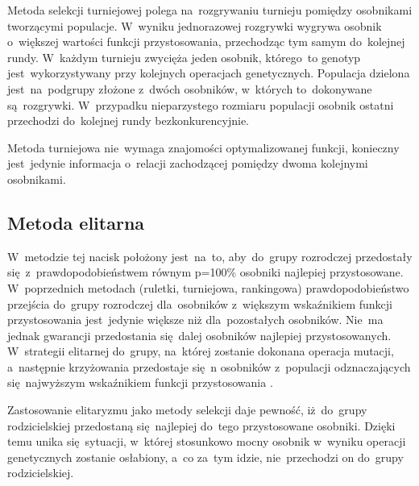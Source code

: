 Metoda selekcji turniejowej polega na~rozgrywaniu turnieju pomiędzy osobnikami tworzącymi populacje. W~wyniku jednorazowej rozgrywki wygrywa osobnik o~większej wartości funkcji przystosowania, przechodząc tym samym do~kolejnej rundy. W~każdym turnieju zwycięża jeden osobnik, którego~to genotyp jest~wykorzystywany przy kolejnych operacjach genetycznych. Populacja dzielona jest~na~podgrupy złożone z~dwóch osobników, w~których to~dokonywane są~rozgrywki. W~przypadku nieparzystego rozmiaru populacji osobnik ostatni przechodzi do~kolejnej rundy bezkonkurencyjnie. \\
\par
Metoda turniejowa nie~wymaga znajomości optymalizowanej funkcji, konieczny jest~jedynie informacja o~relacji zachodzącej pomiędzy dwoma kolejnymi osobnikami. 

\subsection{Metoda elitarna}\label{sec:przygotowanieDokumentu}

W~metodzie tej nacisk położony jest~na~to, aby~do~grupy rozrodczej przedostały się~z~prawdopodobieństwem równym p=100\% osobniki najlepiej przystosowane. W~poprzednich metodach (ruletki, turniejowa, rankingowa) prawdopodobieństwo przejścia do~grupy rozrodczej dla~osobników z~większym wskaźnikiem funkcji przystosowania jest~jedynie większe niż dla~pozostałych osobników. Nie~ma jednak gwarancji przedostania się~dalej osobników najlepiej przystosowanych. W~strategii elitarnej do~grupy, na~której zostanie dokonana operacja mutacji, a~następnie krzyżowania przedostaje się~n osobników z~populacji odznaczających się~najwyższym wskaźnikiem funkcji przystosowania \cite{michal}.\\
\par
Zastosowanie elitaryzmu jako metody selekcji daje pewność, iż~do~grupy rodzicielskiej przedostaną się~najlepiej do~tego przystosowane osobniki. Dzięki temu unika się~sytuacji, w~której stosunkowo mocny osobnik w~wyniku operacji genetycznych zostanie osłabiony, a~co za~tym idzie, nie~przechodzi on do~grupy rodzicielskiej.\\